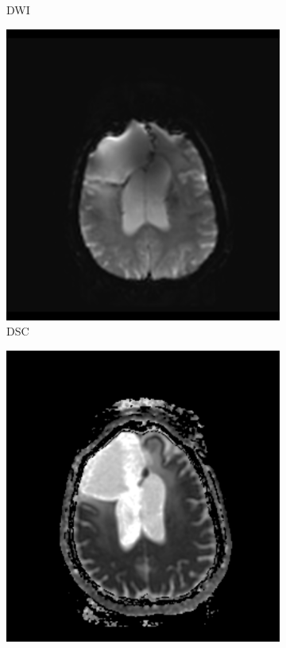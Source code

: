 \begin{figure}
\begin{subfigure}[t]{\figexamplewidth}
    \caption{\gls{DWI}}\label{fig:DWI}
\end{subfigure}
\begin{subfigure}[t]{\figexamplewidth}
    \centering
    \includegraphics[trim={0.5cm 0cm 0.5cm 1cm}, clip, width=\textwidth]{Figures/DSC}
    \caption{\gls{DSC}}\label{fig:PWI-DSC}
\end{subfigure}
\begin{subfigure}[t]{\figexamplewidth}
    \centering
    \includegraphics[trim={0.5cm 0cm 0.5cm 1cm}, clip, width=\textwidth]{Figures/DERIVED}

\end{subfigure}
\end{figure}
